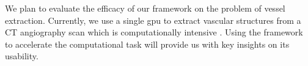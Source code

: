 We plan to evaluate the efficacy of our framework on the problem of vessel
extraction. Currently, we use a single \gls{gpu} to extract vascular structures
from a CT angiography scan which is computationally intensive
\cite{erdt2008automatic}. Using the framework to accelerate the computational
task will provide us with key insights on its usability.
